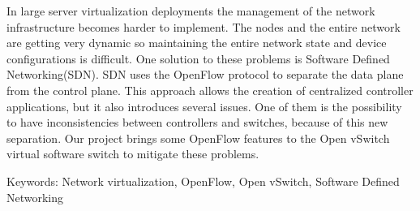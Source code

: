 
In large server virtualization deployments the management of the network infrastructure
becomes harder to implement. The nodes and the entire network are getting very dynamic
so maintaining the entire network state and device configurations is difficult. One
solution to these problems is Software Defined Networking(SDN). SDN uses the OpenFlow
protocol to separate the data plane from the control plane. This approach allows the creation
of centralized controller applications, but it also introduces several issues.
One of them is the possibility to have inconsistencies between controllers and switches,
because of this new separation. Our project brings some OpenFlow features to the
Open vSwitch virtual software switch to mitigate these problems.

Keywords: Network virtualization, OpenFlow, Open vSwitch, Software Defined Networking

